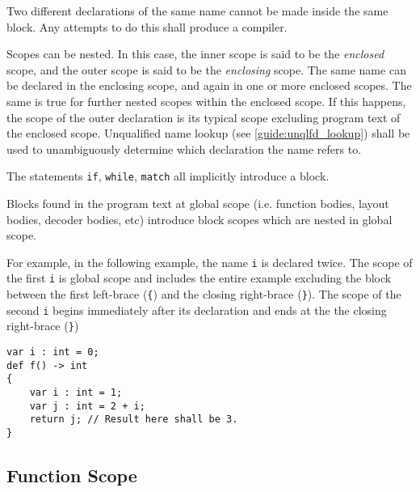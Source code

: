 Two different declarations of the same name cannot be made inside the same block. Any attempts to do this shall produce a compiler.

Scopes can be nested. In this case, the inner scope is said to be the \textit{enclosed} scope, and the outer scope is said to be the \textit{enclosing} scope. The same name can be declared in the enclosing scope, and again in one or more enclosed scopes. The same is true for further nested scopes within the enclosed scope. If this happens, the scope of the outer declaration is its typical scope excluding program text of the enclosed scope. Unqualified name lookup (see \ref{guide:unqlfd_lookup}) shall be used to unambiguously determine which declaration the name refers to.

The statements \texttt{if}, \texttt{while}, \texttt{match} all implicitly introduce a block.


Blocks found in the program text at global scope (i.e. function bodies, layout bodies, decoder bodies, etc) introduce block scopes which are nested in global scope.

For example, in the following example, the name \texttt{i} is declared twice. The scope of the first \texttt{i} is global scope and includes the entire example excluding the block between the first left-brace (\texttt{\{}) and the closing right-brace (\texttt{\}}). The scope of the second \texttt{i} begins immediately after its declaration and ends at the the closing right-brace (\texttt{\}})

\begin{minip}
\begin{lstlisting}
var i : int = 0;
def f() -> int
{
	var i : int = 1;
	var j : int = 2 + i;
	return j; // Result here shall be 3.
}
\end{lstlisting}
\end{minip}

\subsection{Function Scope} \label{guide:function_scope}


